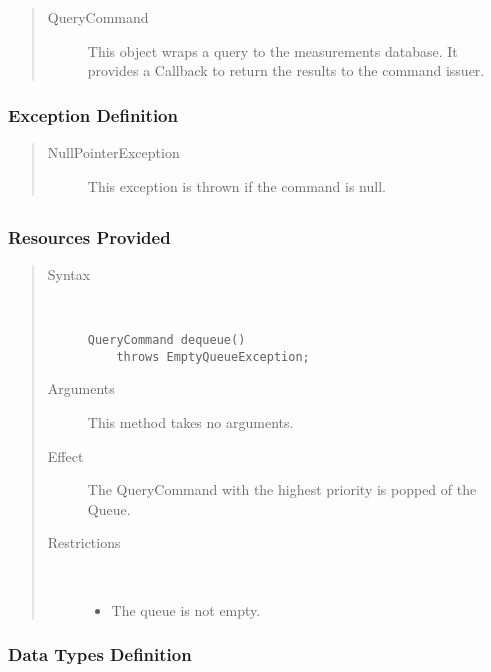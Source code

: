 \begin{quote}
	\begin{description}
		\item[QueryCommand] This object wraps a query to the measurements database. It
		provides a Callback to return the results to the command issuer.
	\end{description} 
\end{quote}

\subsubsection{Exception Definition}

\begin{quote}
	\begin{description}
		\item[NullPointerException] This exception is thrown if the command is null.
	\end{description} 
\end{quote}

\subsection{}

\subsubsection{Resources Provided}

\begin{quote}
	\begin{description}
		\item[Syntax] \ 
		\begin{verbatim}
QueryCommand dequeue() 
    throws EmptyQueueException;
		\end{verbatim}
		\item[Arguments] This method takes no arguments.
		\item[Effect] The QueryCommand with the highest priority is popped of the
		Queue.
		\item[Restrictions] \ 
		\begin{itemize}
			\item The queue is not empty. 
		\end{itemize}
	\end{description} 
\end{quote}

\subsubsection{Data Types Definition}

